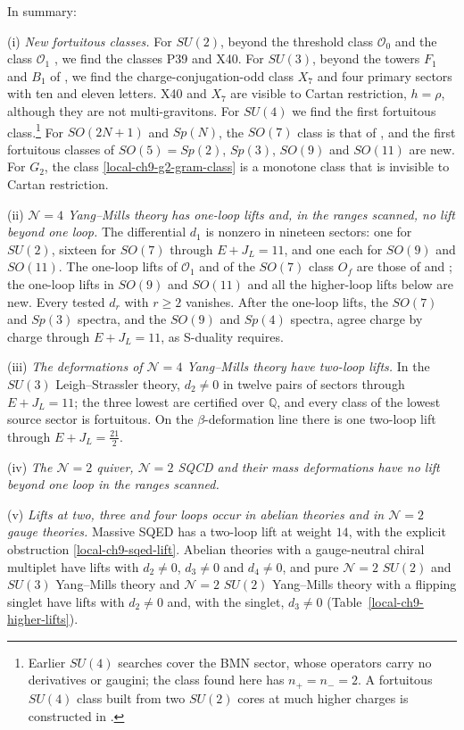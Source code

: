 \documentclass[11pt]{article}
\numberwithin{equation}{section}
\numberwithin{figure}{section}
\numberwithin{table}{section}
\begin{document}
In summary:

(i) \emph{New fortuitous classes.} For $SU(2)$, beyond the threshold class $\mathcal O_0$ \cite{KKLP,ChangLinWords} and the class $\mathcal O_1$ \cite{microstates}, we find the classes P39 and X40. For $SU(3)$, beyond the towers $F_1$ and $B_1$ of \cite{KLLS,BraneFused}, we find the charge-conjugation-odd class $X_7$ and four primary sectors with ten and eleven letters. X40 and $X_7$ are visible to Cartan restriction, $h=\rho$, although they are not multi-gravitons. For $SU(4)$ we find the first fortuitous class.\footnote{Earlier $SU(4)$ searches \cite{CCKLL,KLLS,FortuityAI} cover the BMN sector, whose operators carry no derivatives or gaugini; the class found here has $n_+=n_-=2$. A fortuitous $SU(4)$ class built from two $SU(2)$ cores at much higher charges is constructed in \cite{MultiCore}.} For $SO(2N+1)$ and $Sp(N)$, the $SO(7)$ class is that of \cite{GLRT}, and the first fortuitous classes of $SO(5)=Sp(2)$, $Sp(3)$, $SO(9)$ and $SO(11)$ are new. For $G_2$, the class \eqref{local-ch9-g2-gram-class} is a monotone class that is invisible to Cartan restriction.

(ii) \emph{$\mathcal N=4$ Yang--Mills theory has one-loop lifts and, in the ranges scanned, no lift beyond one loop.} The differential $d_1$ is nonzero in nineteen sectors: one for $SU(2)$, sixteen for $SO(7)$ through $E+J_L=11$, and one each for $SO(9)$ and $SO(11)$. The one-loop lifts of $\mathcal O_1$ and of the $SO(7)$ class $O_f$ are those of \cite{KKLP} and \cite{KonishiBH}; the one-loop lifts in $SO(9)$ and $SO(11)$ and all the higher-loop lifts below are new. Every tested $d_r$ with $r\ge2$ vanishes. After the one-loop lifts, the $SO(7)$ and $Sp(3)$ spectra, and the $SO(9)$ and $Sp(4)$ spectra, agree charge by charge through $E+J_L=11$, as S-duality requires.

(iii) \emph{The deformations of $\mathcal N=4$ Yang--Mills theory have two-loop lifts.} In the $SU(3)$ Leigh--Strassler theory, $d_2\ne0$ in twelve pairs of sectors through $E+J_L=11$; the three lowest are certified over $\mathbb Q$, and every class of the lowest source sector is fortuitous. On the $\beta$-deformation line there is one two-loop lift through $E+J_L=\tfrac{21}2$.

(iv) \emph{The $\mathcal N=2$ quiver, $\mathcal N=2$ SQCD and their mass deformations have no lift beyond one loop in the ranges scanned.}

(v) \emph{Lifts at two, three and four loops occur in abelian theories and in $\mathcal N=2$ gauge theories.} Massive SQED has a two-loop lift at weight $14$, with the explicit obstruction \eqref{local-ch9-sqed-lift}. Abelian theories with a gauge-neutral chiral multiplet have lifts with $d_2\ne0$, $d_3\ne0$ and $d_4\ne0$, and pure $\mathcal N=2$ $SU(2)$ and $SU(3)$ Yang--Mills theory and $\mathcal N=2$ $SU(2)$ Yang--Mills theory with a flipping singlet have lifts with $d_2\ne0$ and, with the singlet, $d_3\ne0$ (Table~\ref{local-ch9-higher-lifts}).
\end{document}
